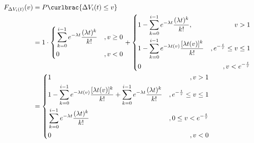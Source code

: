 \documentclass[11pt]{article}
\begin{document}
\begin{align}
  \begin{aligned}
    F_{\Delta V_i(t)}(v) & =P\curlbrac{\Delta V_i(t)\le v}                                                                                                                                                                       \\
                         & =1\cdot\left\{
                          \begin{aligned}
                            & \sum_{k=0}^{i-1}e^{-\lambda t}\frac{(\lambda t)^k}{k!} & ,v\ge 0         \\
                                                                                    & 0       & ,v< 0
                           \end{aligned}\right.+\left\{\begin{aligned}
                                                          & 1-\sum_{k=0}^{i-1}e^{-\lambda t}\frac{(\lambda t)^k}{k!},      & v>1                    \\
                                                          & 1-\sum_{k=0}^{i-1}e^{-\lambda t(v)}\frac{[\lambda t(v)]^k}{k!}
                                                          & ,e^{-\frac{t}{\tau}}\le v\le 1                                                          \\
                                                          & 0                                                              & ,v<e^{-\frac{t}{\tau}}
                                                       \end{aligned} \right.                                                        \\
                         & =\left\{\begin{aligned}
                                      & 1                                                                                                                     & ,v>1                              \\
                                      & 1-\sum_{k=0}^{i-1}e^{-\lambda t(v)}\frac{[\lambda t(v)]^k}{k!}+\sum_{k=0}^{i-1}e^{-\lambda t}\frac{(\lambda t)^k}{k!} & , e^{-\frac{t}{\tau}} \le v \le 1 \\
                                      & \sum_{k=0}^{i-1}e^{-\lambda t}\frac{(\lambda t)^k}{k!}                                                                & ,0\le v<e^{-\frac{t}{\tau}}       \\
                                      & 0                                                                                                                     & ,v<0
                                   \end{aligned}\right.
  \end{aligned}
\end{align}\par
\end{document}
